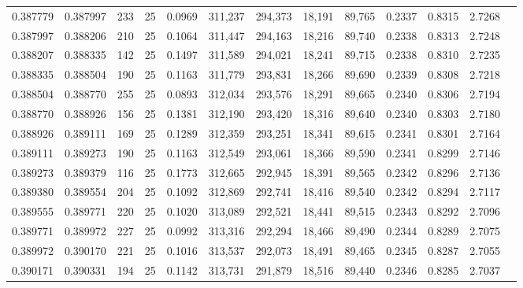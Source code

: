 \begin{tabular}{rrrrrrrrrrrrr}
0.387779 & 0.387997 &   233 &  25 &                                     0.0969 & 311,237 & 294,373 &  18,191 &  89,765 & 0.2337 & 0.8315 & 2.7268 \\
0.387997 & 0.388206 &   210 &  25 &                                     0.1064 & 311,447 & 294,163 &  18,216 &  89,740 & 0.2338 & 0.8313 & 2.7248 \\
0.388207 & 0.388335 &   142 &  25 &                                     0.1497 & 311,589 & 294,021 &  18,241 &  89,715 & 0.2338 & 0.8310 & 2.7235 \\
0.388335 & 0.388504 &   190 &  25 &                                     0.1163 & 311,779 & 293,831 &  18,266 &  89,690 & 0.2339 & 0.8308 & 2.7218 \\
0.388504 & 0.388770 &   255 &  25 &                                     0.0893 & 312,034 & 293,576 &  18,291 &  89,665 & 0.2340 & 0.8306 & 2.7194 \\
0.388770 & 0.388926 &   156 &  25 &                                     0.1381 & 312,190 & 293,420 &  18,316 &  89,640 & 0.2340 & 0.8303 & 2.7180 \\
0.388926 & 0.389111 &   169 &  25 &                                     0.1289 & 312,359 & 293,251 &  18,341 &  89,615 & 0.2341 & 0.8301 & 2.7164 \\
0.389111 & 0.389273 &   190 &  25 &                                     0.1163 & 312,549 & 293,061 &  18,366 &  89,590 & 0.2341 & 0.8299 & 2.7146 \\
0.389273 & 0.389379 &   116 &  25 &                                     0.1773 & 312,665 & 292,945 &  18,391 &  89,565 & 0.2342 & 0.8296 & 2.7136 \\
0.389380 & 0.389554 &   204 &  25 &                                     0.1092 & 312,869 & 292,741 &  18,416 &  89,540 & 0.2342 & 0.8294 & 2.7117 \\
0.389555 & 0.389771 &   220 &  25 &                                     0.1020 & 313,089 & 292,521 &  18,441 &  89,515 & 0.2343 & 0.8292 & 2.7096 \\
0.389771 & 0.389972 &   227 &  25 &                                     0.0992 & 313,316 & 292,294 &  18,466 &  89,490 & 0.2344 & 0.8289 & 2.7075 \\
0.389972 & 0.390170 &   221 &  25 &                                     0.1016 & 313,537 & 292,073 &  18,491 &  89,465 & 0.2345 & 0.8287 & 2.7055 \\
0.390171 & 0.390331 &   194 &  25 &                                     0.1142 & 313,731 & 291,879 &  18,516 &  89,440 & 0.2346 & 0.8285 & 2.7037 \\

\end{tabular}
